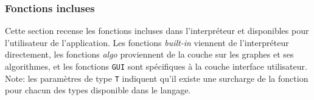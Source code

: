 \documentclass[french]{article}
\begin{document}
			\subsubsection{Fonctions incluses}
			\label{subsec:annexes-fonctions-incluses}
			Cette section recense les fonctions incluses dans l'interpréteur et disponibles pour l'utilisateur de l'application. Les fonctions \textit{built-in} viennent de l'interpréteur directement, les fonctions \textit{algo} proviennent de la couche sur les graphes et ses algorithmes, et les fonctions \texttt{GUI} sont spécifiques à la couche interface utilisateur.\\
			
			Note: les paramètres de type \texttt{T} indiquent qu'il existe une surcharge de la fonction pour chacun des types disponible dans le langage.
			
\end{document}
